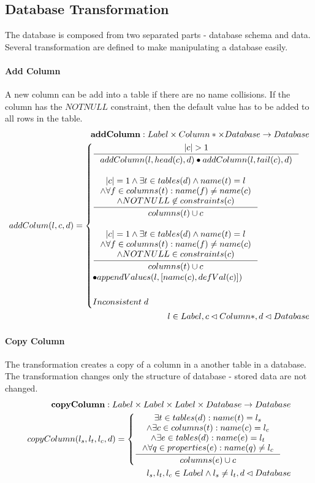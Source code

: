 \documentclass[11pt]{article}
\begin{document}
\subsection{Database Transformation}
The database is composed from two separated parts - database schema and data. Several transformation are defined to make manipulating a database easily.
\paragraph{Add Column} A new column can be add into a table if there are no name collisions. If the column has the $NOTNULL$ constraint, then the default value has to be added to all rows in the table.
\begin{align*}
	\mathbf{addColumn} : Label \times Column* \times Database \rightarrow Database \\ 	
	addColum(l, c, d) = \begin{cases}
		\inference{|c| > 1}{addColumn(l, head(c), d) \bullet addColumn(l, tail(c), d)} \\ \\
		\inference{|c| = 1 \wedge \exists t \in tables(d) \wedge name(t) = l \\ \wedge \forall f \in columns(t) : name(f) \neq name(c) \\ \wedge NOTNULL \not \in constraints(c) }{columns(t) \cup c}\\ \\
		\inference{|c| = 1 \wedge \exists t \in tables(d) \wedge name(t) = l \\ \wedge \forall f \in columns(t) : name(f) \neq name(c) \\ \wedge NOTNULL \in constraints(c) }{columns(t) \cup c}\\ \bullet appendValues(l, [name(c), defVal(c)]) \\ \\
		Inconsistent \;d 
	 \end{cases}\\ 
	 l \in Label, c \lhd Column*,d \lhd Database
\end{align*}

\paragraph{Copy Column} The transformation creates a copy of a column in a another table in a database. The transformation changes only the structure of database - stored data are not changed.
\begin{align*}
	\mathbf{copyColumn} : Label \times Label \times Label \times Database \rightarrow Database \\
	copyColumn(l_s, l_t, l_c, d) = \begin{cases}
 		\inference{\exists t \in tables(d) : name(t) = l_s \\ \wedge \exists c \in columns(t) : name(c) = l_c \\ \wedge \exists e \in tables(d) : name(e) = l_t  \\ \wedge \forall q \in properties(e) : name(q) \neq l_c}{columns(e) \cup c} 
	\end{cases} \\
	l_s,l_t,l_c \in Label \wedge l_s \neq l_t,d \lhd Database
\end{align*}
\end{document}
